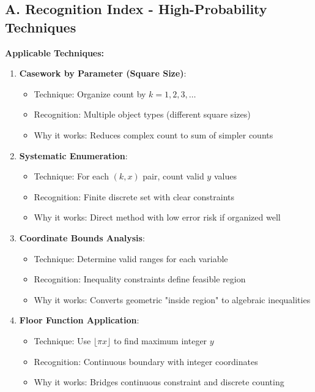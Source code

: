 \documentclass[12pt]{article}
\begin{document}
\begin{conversionbox}
\subsection*{A. Recognition Index - High-Probability Techniques}

\textbf{Applicable Techniques:}

\begin{enumerate}
    \item \textbf{Casework by Parameter (Square Size)}: 
    \begin{itemize}
        \item Technique: Organize count by $k = 1, 2, 3, \ldots$
        \item Recognition: Multiple object types (different square sizes)
        \item Why it works: Reduces complex count to sum of simpler counts
    \end{itemize}
    
    \item \textbf{Systematic Enumeration}: 
    \begin{itemize}
        \item Technique: For each $(k, x)$ pair, count valid $y$ values
        \item Recognition: Finite discrete set with clear constraints
        \item Why it works: Direct method with low error risk if organized well
    \end{itemize}
    
    \item \textbf{Coordinate Bounds Analysis}: 
    \begin{itemize}
        \item Technique: Determine valid ranges for each variable
        \item Recognition: Inequality constraints define feasible region
        \item Why it works: Converts geometric "inside region" to algebraic inequalities
    \end{itemize}
    
    \item \textbf{Floor Function Application}: 
    \begin{itemize}
        \item Technique: Use $\lfloor \pi x \rfloor$ to find maximum integer $y$
        \item Recognition: Continuous boundary with integer coordinates
        \item Why it works: Bridges continuous constraint and discrete counting
    \end{itemize}
\end{enumerate}


\end{conversionbox}
\end{document}
